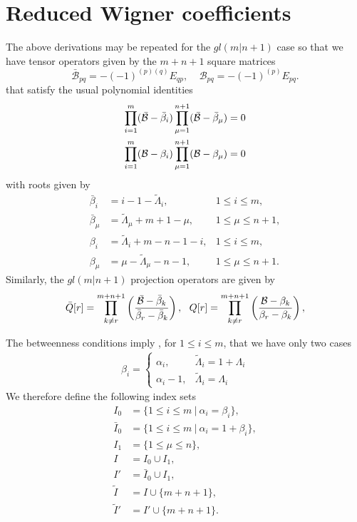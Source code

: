 \documentclass[12pt]{article}
\def\nn{\nonumber}
\begin{document}
\section{Reduced Wigner coefficients} 
\label{Wigner}
The above derivations may be repeated for the $gl(m|n+1)$ case so that we have tensor operators given by the $m+n+1$ square matrices
$$
\bar{\mathcal{B}}_{pq} = -(-1)^{(p)(q)} E_{qp}, ~~~~~\mathcal{B}_{pq} = -(-1)^{(p)} E_{pq}.
$$
that satisfy the usual polynomial identities 
\begin{align*}
\prod_{i=1}^m ({\cal \bar{B}} - \bar{\beta}_i) \prod^{n+1}_{\mu = 1} ({\cal \bar{B}} - \bar{\beta}_\mu) &= 0 \\
	\prod^m_{i=1} ({\cal B} - \beta_i) \prod^{n+1}_{\mu=1} ({\cal B} - \beta_\mu) &= 0 
\end{align*}
with roots given by
\begin{align*}
\bar{\beta}_i  &= i - 1 -{\tilde{\Lambda}}_i , &1\leq i\leq m, \\
\bar{\beta}_\mu &= {\tilde{\Lambda}}_\mu + m + 1 - \mu,  &1\leq \mu \leq n + 1, \\
\beta_i &= {\tilde{\Lambda}}_i + m - n - 1 - i, &1\leq i\leq m, \\
\beta_\mu &= \mu-{\tilde{\Lambda}}_\mu - n - 1, &1\leq \mu \leq n + 1.  
\end{align*}
Similarly, the $gl(m|n+1)$ projection operators are given by
\begin{align}
\bar{Q}[r] = \prod_{k\neq r}^{m+n+1}\left( \frac{{\cal \bar{B}}-\bar{\beta}_k}{\bar{\beta}_r -
\bar{\beta}_k} \right),
\ \ 
Q[r] = \prod_{k\neq r}^{m+n+1}\left( \frac{
{\cal B}-\beta_k}{\beta_r-\beta_k} \right),
\end{align}

The betweenness conditions imply 
\cite{GIW1}, for $1\leq i\leq m$, that we have only two cases
\begin{align}
\beta_i = \left\{ \begin{array}{rl} \alpha_i,& \tilde{\Lambda}_i = 1+\Lambda_i\\
                                    \alpha_i - 1,& \tilde{\Lambda}_i = \Lambda_i 
\end{array} \right.
\nn
\end{align}
We therefore define the following index sets
\begin{align}
I_0 &=  \{ 1\leq i\leq m\ |\ \alpha_i=\beta_i\},\nn\\
\bar{I}_0 &=  \{ 1\leq i\leq m\ |\ \alpha_i=1+\beta_i\},\nn\\
I_1 &= \{ 1\leq\mu\leq n\},\nn\\
I &= I_0\cup I_1,\nn\\
I'&= \bar{I}_0\cup I_1,\nn\\
\tilde{I} &= I\cup \{m+n+1\},\nn\\
\tilde{I}' &= I'\cup \{m+n+1\}.
\label{DefIndexSets} 
\end{align}
\end{document}
